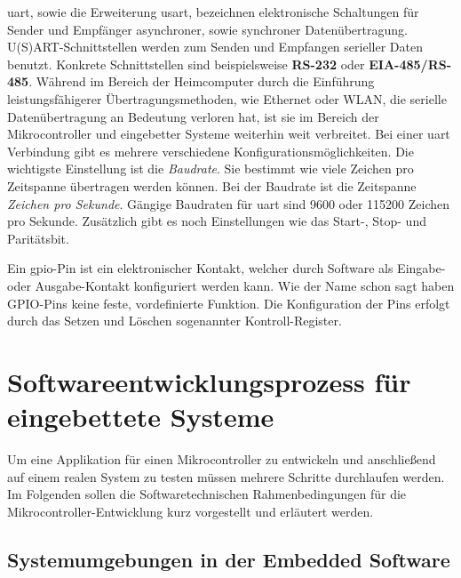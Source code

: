 \ac{uart}, sowie die Erweiterung \ac{usart}, bezeichnen elektronische
Schaltungen für Sender und Empfänger asynchroner, sowie synchroner
Datenübertragung\cite{Digitec_WGehrke_MWinzker}.
U(S)ART-Schnittstellen werden zum Senden und Empfangen serieller Daten benutzt.
Konkrete Schnittstellen sind beispielsweise \textbf{RS-232} oder
\textbf{EIA-485/RS-485}.
Während im Bereich der Heimcomputer durch die Einführung leistungsfähigerer
Übertragungsmethoden, wie Ethernet oder WLAN, die serielle Datenübertragung an
Bedeutung verloren hat, ist sie im Bereich der Mikrocontroller und eingebetter
Systeme weiterhin weit verbreitet\cite{Digitec_WGehrke_MWinzker}.
Bei einer \ac{uart} Verbindung gibt es mehrere verschiedene
Konfigurationsmöglichkeiten.
Die wichtigste Einstellung ist die \textit{Baudrate}.
Sie bestimmt wie viele Zeichen pro Zeitspanne übertragen werden können.
Bei der Baudrate ist die Zeitspanne \textit{Zeichen pro Sekunde}.
Gängige Baudraten für \ac{uart} sind 9600 oder 115200 Zeichen pro Sekunde.
Zusätzlich gibt es noch Einstellungen wie das Start-, Stop- und Paritätsbit.

Ein \ac{gpio}-Pin ist ein elektronischer Kontakt, welcher durch Software als
Eingabe- oder Ausgabe-Kontakt konfiguriert werden
kann\cite{Digitec_WGehrke_MWinzker}.
Wie der Name schon sagt haben GPIO-Pins keine feste, vordefinierte Funktion.
Die Konfiguration der Pins erfolgt durch das Setzen und Löschen sogenannter
Kontroll-Register.



\section{Softwareentwicklungsprozess für eingebettete Systeme}

Um eine Applikation für einen Mikrocontroller zu entwickeln und anschließend
auf einem realen System zu testen müssen mehrere Schritte durchlaufen werden.
Im Folgenden sollen die Softwaretechnischen Rahmenbedingungen für die
Mikrocontroller-Entwicklung kurz vorgestellt und erläutert werden.

\subsection{Systemumgebungen in der Embedded Software}

